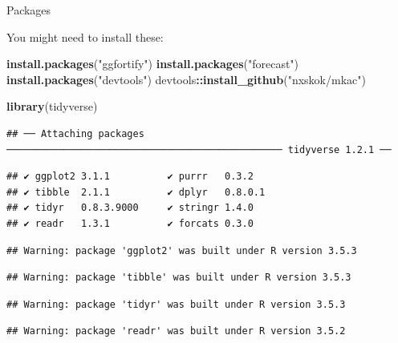 \documentclass[ignorenonframetext,]{beamer}
\newenvironment{Shaded}{\begin{snugshade}}{\end{snugshade}}
\newcommand{\KeywordTok}[1]{\textcolor[rgb]{0.13,0.29,0.53}{\textbf{#1}}}
\newcommand{\NormalTok}[1]{#1}
\newcommand{\OperatorTok}[1]{\textcolor[rgb]{0.81,0.36,0.00}{\textbf{#1}}}
\newcommand{\StringTok}[1]{\textcolor[rgb]{0.31,0.60,0.02}{#1}}
\begin{document}
\begin{frame}[fragile]{Packages}
\protect\hypertarget{packages-11}{}

You might need to install these:

\begin{Shaded}
\begin{Highlighting}[]
\KeywordTok{install.packages}\NormalTok{(}\StringTok{"ggfortify"}\NormalTok{)}
\KeywordTok{install.packages}\NormalTok{(}\StringTok{"forecast"}\NormalTok{)}
\KeywordTok{install.packages}\NormalTok{(}\StringTok{"devtools"}\NormalTok{)}
\NormalTok{devtools}\OperatorTok{::}\KeywordTok{install_github}\NormalTok{(}\StringTok{"nxskok/mkac"}\NormalTok{)}
\end{Highlighting}
\end{Shaded}

\begin{Shaded}
\begin{Highlighting}[]
\KeywordTok{library}\NormalTok{(tidyverse)}
\end{Highlighting}
\end{Shaded}

\begin{verbatim}
## ── Attaching packages ──────────────────────────────────────────────── tidyverse 1.2.1 ──
\end{verbatim}

\begin{verbatim}
## ✔ ggplot2 3.1.1          ✔ purrr   0.3.2     
## ✔ tibble  2.1.1          ✔ dplyr   0.8.0.1   
## ✔ tidyr   0.8.3.9000     ✔ stringr 1.4.0     
## ✔ readr   1.3.1          ✔ forcats 0.3.0
\end{verbatim}

\begin{verbatim}
## Warning: package 'ggplot2' was built under R version 3.5.3
\end{verbatim}

\begin{verbatim}
## Warning: package 'tibble' was built under R version 3.5.3
\end{verbatim}

\begin{verbatim}
## Warning: package 'tidyr' was built under R version 3.5.3
\end{verbatim}

\begin{verbatim}
## Warning: package 'readr' was built under R version 3.5.2
\end{verbatim}


\end{frame}
\end{document}
